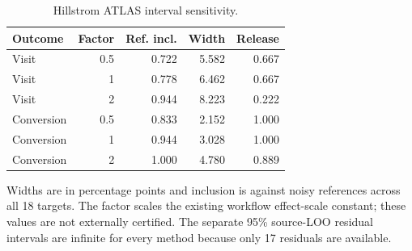 \begin{table}[htbp]
\centering\small
\setlength{\tabcolsep}{4pt}
\caption{Hillstrom ATLAS interval sensitivity.}
\label{tab:b-hillstrom-interval}
\begin{tabular}{lrrrr}
\toprule
Outcome & Factor & Ref. incl. & Width & Release \\
\midrule
Visit & 0.5 & 0.722 & 5.582 & 0.667 \\
Visit & 1 & 0.778 & 6.462 & 0.667 \\
Visit & 2 & 0.944 & 8.223 & 0.222 \\
Conversion & 0.5 & 0.833 & 2.152 & 1.000 \\
Conversion & 1 & 0.944 & 3.028 & 1.000 \\
Conversion & 2 & 1.000 & 4.780 & 0.889 \\
\bottomrule
\end{tabular}
\par\smallskip\begin{minipage}{0.97\linewidth}\footnotesize Widths are in percentage points and inclusion is against noisy references across all 18 targets. The factor scales the existing workflow effect-scale constant; these values are not externally certified. The separate 95\% source-LOO residual intervals are infinite for every method because only 17 residuals are available.\end{minipage}
\end{table}
